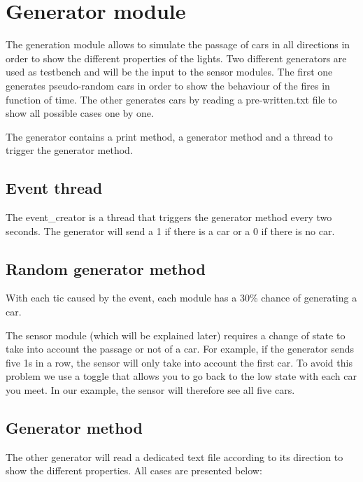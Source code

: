 \section{Generator module}

The generation module allows to simulate the passage of cars in all directions in order to show the different properties of the lights. Two different generators are used as testbench and will be the input to the sensor modules. 
The first one generates pseudo-random cars in order to show the behaviour of the fires in function of time.
The other generates cars by reading a pre-written.txt file to show all possible cases one by one. 

The generator contains a print method, a generator method and a thread to trigger the generator method.

\subsection{Event thread}

The event{\_}creator is a thread that triggers the generator method every two seconds. The generator will send a 1 if there is a car or a 0 if there is no car.

\subsection{Random generator method}

With each tic caused by the event, each module has a 30{\%} chance of generating a car.

The sensor module (which will be explained later) requires a change of state to take into account the passage or not of a car. For example, if the generator sends five 1s in a row, the sensor will only take into account the first car. 
To avoid this problem we use a toggle that allows you to go back to the low state with each car you meet. In our example, the sensor will therefore see all five cars.

\subsection{Generator method}

The other generator will read a dedicated text file according to its direction to show the different properties. 
All cases are presented below: 

